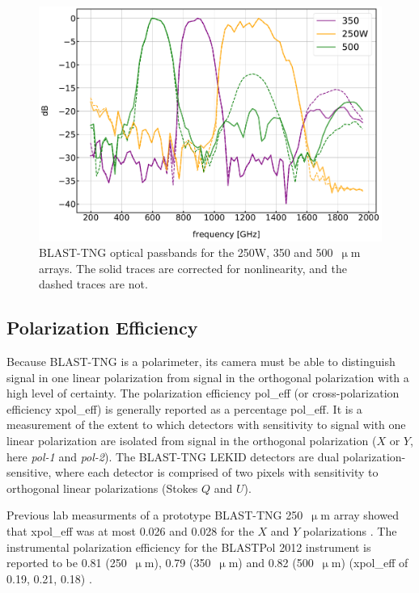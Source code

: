 \begin{figure}[!htbp]
\centering
\includegraphics[width=\textwidth]{figures/blast_data/fts/passbands_raw}
\caption{BLAST-TNG optical passbands for the 250W, 350 and 500~$\upmu$m arrays. The solid traces are corrected for nonlinearity, and the dashed traces are not.}
\label{fig:passbands_corr}
\end{figure}

\subsection{Polarization Efficiency}\label{pol eff}

Because BLAST-TNG is a polarimeter, its camera must be able to distinguish signal in one linear polarization from signal in the orthogonal polarization with a high level of certainty. The polarization efficiency \gls{pol_eff} (or cross-polarization efficiency \gls{xpol_eff}) is generally reported as a percentage \gls{pol_eff}. It is a measurement of the extent to which detectors with sensitivity to signal with one linear polarization are isolated from signal in the orthogonal polarization ($X$ or $Y$, here \textit{pol-1} and \textit{pol-2}). The BLAST-TNG LEKID detectors are dual polarization-sensitive, where each detector is comprised of two pixels with sensitivity to orthogonal linear polarizations (Stokes $Q$ and $U$).

Previous lab measurments of a prototype BLAST-TNG 250~$\upmu$m array showed that \gls{xpol_eff} was at most 0.026 and 0.028 for the $X$ and $Y$ polarizations \citep{dober2016optical}. The instrumental polarization efficiency for the BLASTPol 2012 instrument is reported to be 0.81 (250~$\upmu$m), 0.79 (350~$\upmu$m) and 0.82 (500~$\upmu$m) (\gls{xpol_eff} of 0.19, 0.21, 0.18) \citep{shariff2015polarimetry}.

